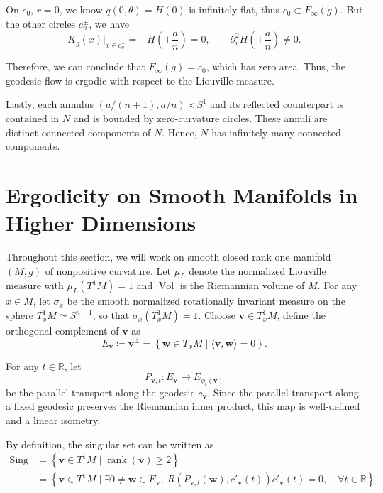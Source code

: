 \documentclass[reqno,11pt]{article}
\theoremstyle{definition}
\theoremstyle{remark}
\numberwithin{equation}{section}
\DeclareMathOperator{\vol}{Vol}
\DeclareMathOperator{\rank}{rank}
\DeclareMathOperator{\sing}{Sing}
\begin{document}
On $c_{0}$, $r=0$, we know $q(0,\theta)=H(0)$ is infinitely flat, thus $c_{0}\subset F_{\infty}(g)$. But the other circles $c_{n}^{\pm}$, we have
\begin{displaymath}
	K_{g}(x)\vert_{x\in c_{n}^{\pm}}=-H(\pm\frac{a}{n})=0,\qquad \partial^2_{r}H(\pm\frac{a}{n})\neq 0.
\end{displaymath}

Therefore, we can conclude that $F_{\infty}(g)=c_0$, which has zero area. Thus, the geodesic flow is ergodic with respect to the Liouville measure.

Lastly, each annulus $(a/(n+1),a/n)\times S^1$ and its reflected counterpart is contained in $N$ and is bounded by zero-curvature circles. These annuli are distinct connected components of $N$. Hence, $N$ has infinitely many connected components.

\section{Ergodicity on Smooth Manifolds in Higher Dimensions}\label{sec5}
Throughout this section, we will work on smooth closed rank one manifold $(M,g)$ of nonpositive curvature. Let $\mu_L$ denote the normalized Liouville measure with $\mu_L(T^{1}M)=1$ and $\vol$ is the Riemannian volume of $M$. For any $x\in M$, let $\sigma_{x}$ be the smooth normalized rotationally invariant measure on the sphere $T^{1}_{x}M\simeq S^{n-1}$, so that $\sigma_{x}(T^{1}_{x}M)=1$. Choose $\bm{v}\in T^{1}_{x}M$, define the orthogonal complement of $\bm{v}$ as
\begin{displaymath}
	E_{\bm{v}}\coloneq\bm{v}^{\perp}=\left\{\bm{w}\in T_{x}M\mid \langle\bm{v},\bm{w}\rangle=0\right\}.
\end{displaymath}

For any $t\in\mathbb{R}$, let
\begin{displaymath}
	P_{\bm{v},t}:E_{\bm{v}}\longrightarrow E_{\phi_{t}(\bm{v})}
\end{displaymath}
be the parallel transport along the geodesic $c_{\bm{v}}$. Since the parallel transport along a fixed geodesic preserves the Riemannian inner product, this map is well-defined and a linear isometry.

By definition, the singular set can be written as
\begin{displaymath}
	\begin{aligned}
		\sing & =\left\{\bm{v}\in T^{1}M\mid \rank(\bm{v})\ge2\right\}                                                                                                         \\
		      & =\left\{\bm{v}\in T^{1}M\mid \exists 0\neq \bm{w}\in E_{\bm{v}},~R(P_{\bm{v},t}(\bm{w}),c'_{\bm{v}}(t))c'_{\bm{v}}(t)=0,\quad \forall t\in\mathbb{R} \right\}.
	\end{aligned}
\end{displaymath}
\end{document}
